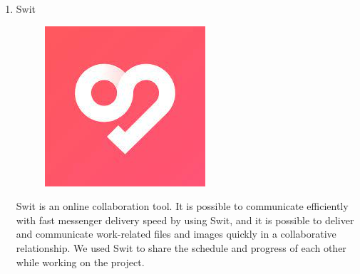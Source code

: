 \documentclass[conference]{IEEEtran}
\begin{document}
\begin{enumerate}
\begin{enumerate}
        \item Swit
        \begin{figure}[H]
                 \centering
                 \includegraphics[scale=0.3]{new_assets/swit-logo.jpg}
                 \end{figure}
        Swit is an online collaboration tool. It is possible to communicate efficiently with fast messenger delivery speed by using Swit, and it is possible to deliver and communicate work-related files and images quickly in a collaborative relationship. We used Swit to share the schedule and progress of each other while working on the project.\\
    \end{enumerate}
    \end{enumerate}
    
\end{document}
